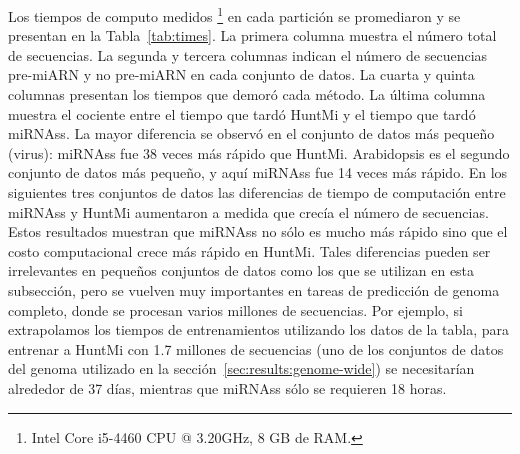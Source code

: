 Los tiempos de computo medidos \footnote{Intel \textregistered Core \texttrademark i5-4460 CPU @ 3.20GHz, 8 GB de RAM.} en cada partición se promediaron y se
presentan en la Tabla~\ref{tab:times}. La primera columna muestra el número total de secuencias. La segunda y tercera columnas indican el número de secuencias
pre-miARN y no pre-miARN en cada conjunto de datos. La cuarta y quinta columnas presentan los tiempos que demoró cada método. La última columna muestra el
cociente entre el tiempo que tardó HuntMi y el tiempo que tardó miRNAss. La mayor diferencia se observó en el conjunto de datos más pequeño (virus): miRNAss fue
38 veces más rápido que HuntMi. Arabidopsis es el segundo conjunto de datos más pequeño, y aquí miRNAss fue 14 veces más rápido. En los siguientes tres
conjuntos de datos las diferencias de tiempo de computación entre miRNAss y HuntMi aumentaron a medida que crecía el número de secuencias. Estos resultados
muestran que miRNAss no sólo es mucho más rápido sino que el costo computacional crece más rápido en HuntMi. Tales diferencias pueden ser irrelevantes en
pequeños conjuntos de datos como los que se utilizan en esta subsección, pero se vuelven muy importantes en tareas de predicción de genoma completo, donde se
procesan varios millones de secuencias. Por ejemplo, si extrapolamos los tiempos de entrenamientos utilizando los datos de la tabla, para entrenar a HuntMi con
1.7 millones de secuencias (uno de los conjuntos de datos del genoma utilizado en la sección~\ref{sec:results:genome-wide}) se necesitarían alrededor de 37
días, mientras que miRNAss sólo se requieren 18 horas.

